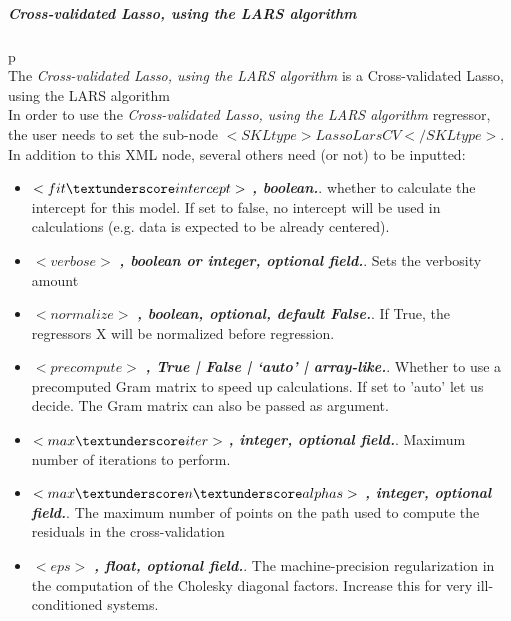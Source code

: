 \subparagraph{Cross-validated Lasso, using the LARS algorithm}
p\mbox{}
\\The \textit{Cross-validated Lasso, using the LARS algorithm} is a Cross-validated Lasso, using the LARS algorithm
\\In order to use the \textit{Cross-validated Lasso, using the LARS algorithm} regressor, the user needs to set the sub-node $<SKLtype>LassoLarsCV</SKLtype>$.
In addition to this XML node, several others need (or not) to be inputted:
\begin{itemize}
  \item $<fit \textunderscore intercept>$ \textbf{\textit{, boolean.}}. whether to calculate the intercept for this model. If set to false, no intercept will be used in calculations (e.g. data is expected to be already centered).
  \item $<verbose>$ \textbf{\textit{, boolean or integer, optional field.}}. Sets the verbosity amount
  \item $<normalize>$ \textbf{\textit{, boolean, optional, default False.}}. If True, the regressors X will be normalized before regression.
  \item $<precompute>$ \textbf{\textit{, True | False | ‘auto’ | array-like.}}. Whether to use a precomputed Gram matrix to speed up calculations. If set to 'auto' let us decide. The Gram matrix can also be passed as argument.
  \item $<max \textunderscore iter>$ \textbf{\textit{, integer, optional field.}}. Maximum number of iterations to perform.
  \item $<max \textunderscore n \textunderscore alphas>$ \textbf{\textit{, integer, optional field.}}. The maximum number of points on the path used to compute the residuals in the cross-validation
  \item $<eps>$ \textbf{\textit{, float, optional field.}}. The machine-precision regularization in the computation of the Cholesky diagonal factors. Increase this for very ill-conditioned systems.
\end{itemize}


